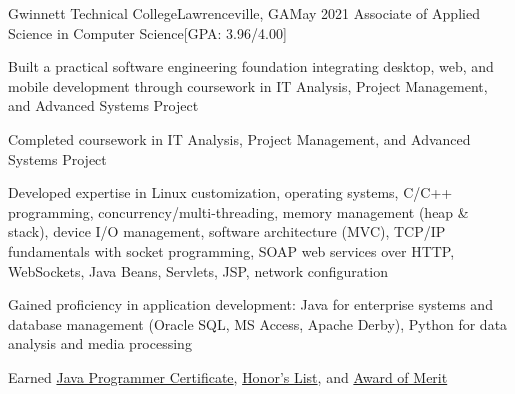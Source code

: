 \begin{resume-itemize}
  {Gwinnett Technical College}{Lawrenceville, GA}{May 2021}
  {Associate of Applied Science in Computer Science}[GPA: 3.96/4.00]
    \item Built a practical software engineering foundation integrating desktop, web, and mobile development through coursework in IT Analysis, Project Management, and Advanced Systems Project
    \item Completed coursework in IT Analysis, Project Management, and Advanced Systems Project
    \item Developed expertise in Linux customization, operating systems, 
    C/C++ programming, concurrency/multi-threading, 
    memory management (heap \& stack), device I/O management,
    software architecture (MVC), 
    TCP/IP fundamentals with socket programming, 
    SOAP web services over HTTP,
    WebSockets, Java Beans, Servlets, JSP, network configuration
    \item Gained proficiency in application development: Java for enterprise systems and database management (Oracle SQL, MS Access, Apache Derby), 
    Python for data analysis and media processing
    \item Earned \href{https://yundaeleesong.github.io/2105-GraduateAward-JavaProgrammer.pdf}{Java Programmer Certificate}, 
    \href{https://yundaeleesong.github.io/1911-HonorsList.pdf}{Honor's List}, and 
    \href{https://yundaeleesong.github.io/2105-MeritAward.pdf}{Award of Merit}
\end{resume-itemize}

